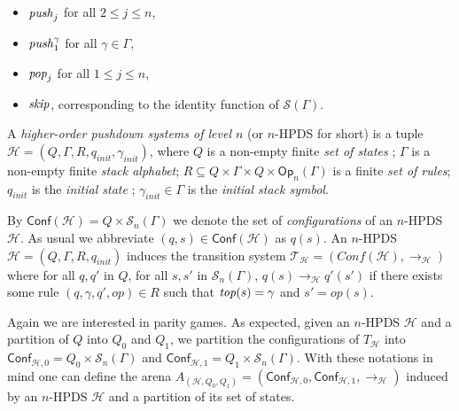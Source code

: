 \documentclass[a4paper,UKenglish,cleveref, autoref, thm-restate]{lipics-v2021}
\newcommand{\T}{\mathcal{T}}
\renewcommand{\H}{\mathcal{H}}
\newcommand{\Conf}{\mathsf{Conf}}
\newcommand{\Op}{\mathsf{Op}}
\begin{document}
\begin{itemize}
\item $\text{\textit{push}}_j$ for all $2 \leq j \leq n$,

\item $\text{\textit{push}}_1^\gamma$ for all $\gamma \in \Gamma$,

\item $\text{\textit{pop}}_j$ for all $1 \leq j \leq n$,

\item $\text{\textit{skip}}$, corresponding to the identity function of $\mathscr{S}(\Gamma)$.

\end{itemize}





\begin{samepage}
\par\noindent\ignorespacesafterend
A {\em higher-order pushdown systems of level $n$} (or $n$-HPDS for short) 
is a tuple $\H=(Q, \Gamma, R, q_{init}, \gamma_{init})$,
where 
 $Q$ is a non-empty finite {\em set of  states} ;
         $\Gamma$ is a non-empty finite {\em  stack alphabet};
	 $R\subseteq Q\times \Gamma \times Q \times \Op_n(\Gamma)$ is a finite {\em set of  rules};
         $q_{init}$ is the {\em initial  state} ;
         $\gamma_{init} \in \Gamma$ is the {\em %
initial stack symbol}.
\end{samepage}


By $\Conf(\mathcal{H}) = Q \times \mathscr{S}_n(\Gamma)$
we denote the set of {\em configurations} of an $n$-HPDS $\H$. 
As usual we abbreviate $(q,s) \in \Conf(\mathcal{H})$ as $q(s)$.
An $n$-HPDS $\H=(Q, \Gamma, R, q_{init})$
induces the transition system $\T_\H = (Conf(\mathcal{H}), \rightarrow_{\mathcal{H}})$
where
for all $q,q'$ in $Q$,
for all $s,s'$ in $\mathscr{S}_n(\Gamma)$,
$q(s) \rightarrow_{\mathcal{H}} q'(s')$ if
there exists some rule
$(q,\gamma,q',op) \in R$
such that
$\text{\textit{top}}(s) = \gamma$
and
$s' = op(s)$.





Again we are interested in parity games.
As expected, given an 
 $n$-HPDS $\mathcal{H}$
 and a partition of
$Q$ into $Q_0$ and $Q_1$,
we partition the configurations of
$T_{\mathcal{H}}$
into
$\Conf_{\mathcal{H},0}=Q_0\times \mathscr{S}_n(\Gamma)$
and
$\Conf_{\mathcal{H},1}=Q_1\times\mathscr{S}_n(\Gamma)$.
%
%
With these notations in mind one can define the arena
$
A_{(\mathcal{H}, Q_0, Q_1)}
=
(\Conf_{\mathcal{H},0}, \Conf_{\mathcal{H},1}, \rightarrow_{\mathcal{H}})$
induced by an $n$-HPDS $\mathcal{H}$ and a partition of its set of states.
\end{document}
